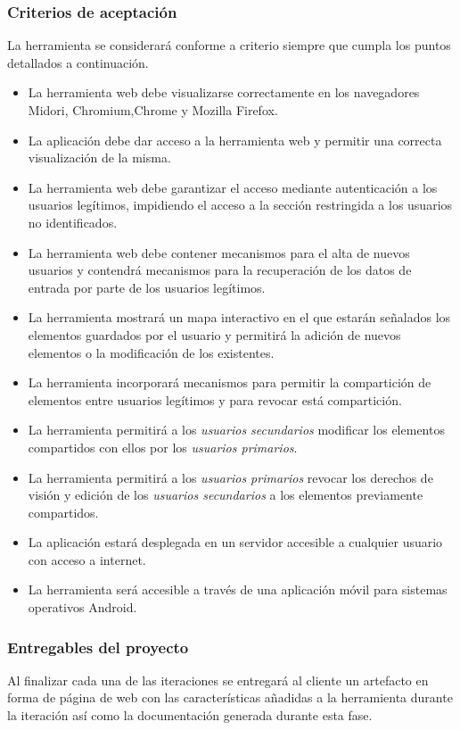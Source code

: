 		\subsubsection{Criterios de aceptación}
		\label{subsubsection:criterios-aceptacion}
		La herramienta se considerará conforme a criterio siempre que cumpla los puntos detallados a continuación.
		
		\begin{itemize}[label={$\bullet$},labelindent=\parindent,leftmargin=2cm]
			\item La herramienta web debe visualizarse correctamente en los navegadores Midori, Chromium,Chrome y Mozilla Firefox.
			\item La aplicación debe dar acceso a la herramienta web y permitir una correcta visualización de la misma.
			\item La herramienta web debe garantizar el acceso mediante autenticación a los usuarios legítimos, impidiendo el acceso a la sección restringida a los usuarios no identificados.
			\item La herramienta web debe contener mecanismos para el alta de nuevos usuarios y contendrá mecanismos para la recuperación de los datos de entrada por parte de los usuarios legítimos.
			\item La herramienta mostrará un mapa interactivo en el que estarán señalados los elementos guardados por el usuario y permitirá la adición de nuevos elementos o la modificación de los existentes.
			\item La herramienta incorporará mecanismos para permitir la compartición de elementos entre usuarios legítimos y para revocar está compartición.
			\item La herramienta permitirá a los \textit{usuarios secundarios} modificar los elementos compartidos con ellos por los \textit{usuarios primarios}.
			\item La herramienta permitirá a los \textit{usuarios primarios} revocar los derechos de visión y edición de los \textit{usuarios secundarios} a los elementos previamente compartidos.
			\item La aplicación estará desplegada en un servidor accesible a cualquier usuario con acceso a internet.
			\item La herramienta será accesible a través de una aplicación móvil para sistemas operativos Android.
		\end{itemize}

		\subsubsection{Entregables del proyecto}
		Al finalizar cada una de las iteraciones se entregará al cliente un artefacto en forma de página de web con las características añadidas a la herramienta durante la iteración así como la documentación generada durante esta fase.
		
